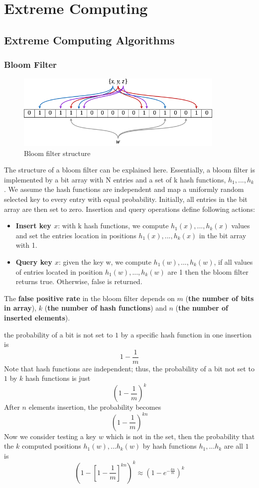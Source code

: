 \documentclass[a3paper, 12pt]{book} %
\begin{document}
\part{Extreme Computing}
\chapter{Extreme Computing Algorithms}
\section{Bloom Filter}
\begin{figure}[htpb]
	\centering
	\includegraphics[width=10cm]{figures/bloom_filter.png}
	\caption{Bloom filter structure}
	\label{fig:boat1}
\end{figure}

The structure of a bloom filter can be explained here. Essentially, a bloom filter
is implemented by a bit array with N entries and a set of k hash functions, $h_1 , ..., h_k$. We assume the hash functions are independent and map a uniformly random selected
key to every entry with equal probability. Initially, all entries in the bit array are then
set to zero. Insertion and query operations define following actions:
\begin{itemize}
	\item \textbf{Insert key $x$}: with k hash functions, we compute $ h_1(x), ..., h_k(x)$ values and
	set the entries location in positions $h_1(x), ..., h_k(x)$ in the bit array with 1.
	\item \textbf{Query key $x$}: given the key w, we compute $h_1(w), ..., h_k(w)$, if all values of entries located in position $h_1(w),...,h_k(w)$ are 1 then the bloom filter returns
	true. Otherwise, false is returned.
\end{itemize}

The \textbf{false positive rate} in the bloom filter depends on $m$ (\textbf{the number of bits in array}), $k$ (\textbf{the number of hash functions}) and $n$ (\textbf{the number of inserted elements}).

the probability of a bit is not set to $1$ by a specific hash function in one insertion is
$$1-\frac{1}{m}$$
Note that hash functions are independent; thus, the probability of a bit not set to $1$ by $k$ hash functions is just
$$(1-\frac{1}{m})^k$$
After $n$ elements insertion, the probability becomes
$$(1-\frac{1}{m})^{kn}$$
Now we consider testing a key $w$ which is not in the set, then the probability
that the $k$ computed positions $h_1(w), ...h_k(w)$ by hash functions $h_1 , ...h_k$ are all $1$ is
$$(1-[1-\frac{1}{m}]^{kn})^k \approx (1-e^{-\frac{kn}{m}})^k$$
\end{document}
